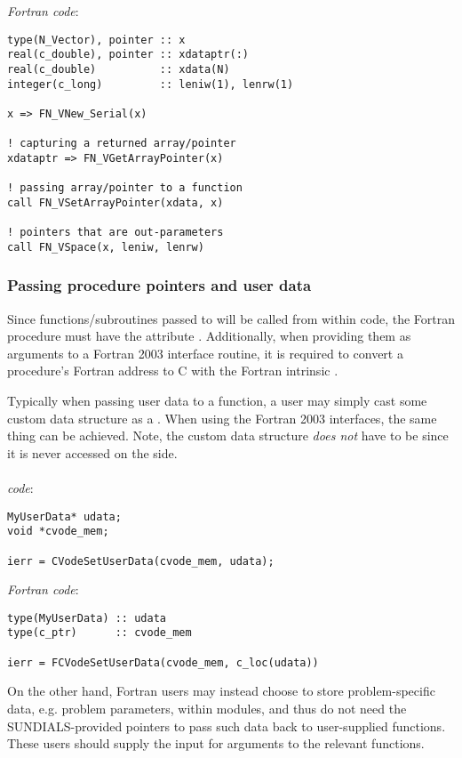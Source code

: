 \noindent \emph{Fortran code}:
\begin{verbatim}
type(N_Vector), pointer :: x
real(c_double), pointer :: xdataptr(:)
real(c_double)          :: xdata(N)
integer(c_long)         :: leniw(1), lenrw(1)

x => FN_VNew_Serial(x)

! capturing a returned array/pointer
xdataptr => FN_VGetArrayPointer(x)

! passing array/pointer to a function
call FN_VSetArrayPointer(xdata, x)

! pointers that are out-parameters
call FN_VSpace(x, leniw, lenrw)
\end{verbatim}

\subsubsection{Passing procedure pointers and user data}

Since functions/subroutines passed to {\sundials} will be called from within
{\CC} code, the Fortran procedure must have the attribute .
Additionally, when providing them as arguments to a Fortran 2003 interface
routine, it is required to convert a procedure's Fortran address to C with
the Fortran intrinsic .

Typically when passing user data to a {\sundials} function, a user may
simply cast some custom data structure as a . When using the
Fortran 2003 interfaces, the same thing can be achieved. Note, the
custom data structure \emph{does not} have to be  since
it is never accessed on the {\CC} side.
\\
\\
\noindent \emph{{\CC} code}:
\begin{verbatim}
MyUserData* udata;
void *cvode_mem;

ierr = CVodeSetUserData(cvode_mem, udata);
\end{verbatim}

\noindent \emph{Fortran code}:
\begin{verbatim}
type(MyUserData) :: udata
type(c_ptr)      :: cvode_mem

ierr = FCVodeSetUserData(cvode_mem, c_loc(udata))
\end{verbatim}

On the other hand, Fortran users may instead choose to store problem-specific data,
e.g. problem parameters, within modules, and thus do not need the SUNDIALS-provided
 pointers to pass such data back to user-supplied functions. These users
should supply the  input for  arguments to the relevant
{\sundials} functions.

